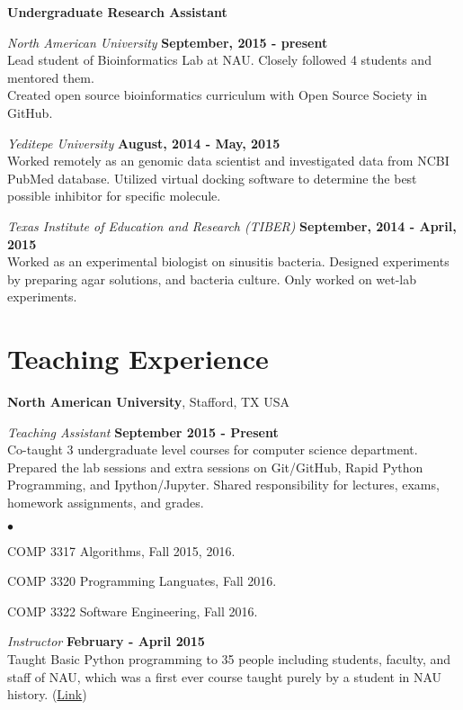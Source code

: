 \documentclass[margin,line]{res}
\newenvironment{list2}{
  \begin{list}{$\bullet$}{%
      \setlength{\itemsep}{0in}
      \setlength{\parsep}{0in} \setlength{\parskip}{0in}
      \setlength{\topsep}{0in} \setlength{\partopsep}{0in} 
      \setlength{\leftmargin}{0.2in}}}{\end{list}}
\begin{document}
\begin{resume}
{\bf Undergraduate Research Assistant}

\vspace{-.3cm}
{\em North American University} \hfill {\bf September, 2015 - present}\\
Lead student of Bioinformatics Lab at NAU. Closely followed 4 students and mentored them.\\
Created open source bioinformatics curriculum with Open Source Society in GitHub.

{\em Yeditepe University} \hfill {\bf August, 2014 - May, 2015}\\
Worked remotely as an genomic data scientist and investigated data from NCBI PubMed database. Utilized virtual docking software to determine the best possible inhibitor for specific molecule.  

{\em Texas Institute of Education and Research (TIBER)} \hfill {\bf September, 2014 - April, 2015}\\
Worked as an experimental biologist on sinusitis bacteria. 
Designed experiments by preparing agar solutions, and bacteria culture.
Only worked on wet-lab experiments.


\section{\sc Teaching Experience}
{\bf North American University}, Stafford, TX USA

\vspace{-.3cm}
{\em Teaching Assistant} \hfill {\bf September 2015 - Present}\\
Co-taught 3 undergraduate level courses for computer science department. Prepared the lab sessions and extra sessions on Git/GitHub, Rapid Python Programming, and Ipython/Jupyter. Shared responsibility for lectures, exams, homework assignments, and  grades.
\vspace*{.05in}  
\begin{list2}
\item COMP 3317 Algorithms, Fall 2015, 2016.
\item COMP 3320 Programming Languates, Fall 2016.
\item COMP 3322 Software Engineering, Fall 2016.
\end{list2}

\vspace{-.3cm}
{\em Instructor} \hfill {\bf February - April 2015}\\
Taught Basic Python programming to 35 people including students, faculty, and staff of NAU, which was a first ever course taught purely by a student in NAU history. (\href{https://github.com/NAU-Python-Class/Py101-Spring-15}{Link})



\end{resume}
\end{document}

